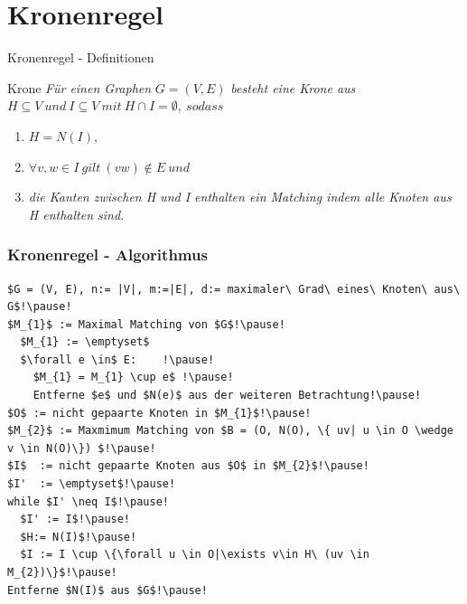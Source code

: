 \documentclass{beamer}
\begin{document}
\section{Kronenregel}

\begin{frame}{Kronenregel - Definitionen}
\begin{block}{Krone}\pause
\textit{Für einen Graphen} $G=(V,E)$ \textit{besteht eine Krone aus} $H \subseteq V\ und\ I \subseteq V\ mit\ H \cap I = \emptyset,\ sodass$ \pause
\begin{enumerate}
\item $H = N(I),$ \pause
\item $\forall v, w \in I\ gilt\ (vw) \notin E\ und$\pause
\item \textit{die Kanten zwischen H und I enthalten ein Matching indem alle Knoten aus H enthalten sind.}
\end{enumerate}
\end{block}
\end{frame}

\begin{frame}[fragile]
\frametitle{Kronenregel - Algorithmus}
\begin{lstlisting}[mathescape=true, escapechar = !,basicstyle=\ttfamily\scriptsize]
$G = (V, E), n:= |V|, m:=|E|, d:= maximaler\ Grad\ eines\ Knoten\ aus\ G$!\pause!
$M_{1}$ := Maximal Matching von $G$!\pause!
  $M_{1} := \emptyset$
  $\forall e \in$ E:	!\pause!
    $M_{1} = M_{1} \cup e$ !\pause!
    Entferne $e$ und $N(e)$ aus der weiteren Betrachtung!\pause!
$O$ := nicht gepaarte Knoten in $M_{1}$!\pause!
$M_{2}$ := Maxmimum Matching von $B = (O, N(O), \{ uv| u \in O \wedge v \in N(O)\}) $!\pause!
$I$  := nicht gepaarte Knoten aus $O$ in $M_{2}$!\pause!
$I'  := \emptyset$!\pause!
while $I' \neq I$!\pause!
  $I' := I$!\pause!
  $H:= N(I)$!\pause!
  $I := I \cup \{\forall u \in O|\exists v\in H\ (uv \in M_{2})\}$!\pause!
Entferne $N(I)$ aus $G$!\pause!
\end{lstlisting}
\end{frame}
\end{document}
